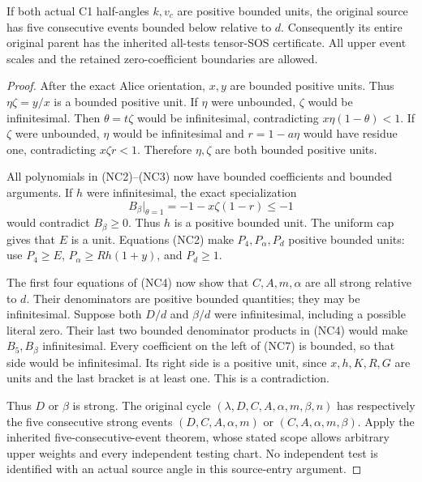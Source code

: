 \begin{theorem}
If both actual C1 half-angles $k,v_c$ are positive bounded units,
the original source has five consecutive events bounded below relative
to $d$. Consequently its entire original parent has the inherited
all-tests tensor-SOS certificate. All upper event scales and the
retained zero-coefficient boundaries are allowed.
\end{theorem}
\begin{proof}
After the exact Alice orientation, $x,y$ are bounded positive units.
Thus $\eta\zeta=y/x$ is a bounded positive unit. If $\eta$ were
unbounded, $\zeta$ would be infinitesimal. Then $\theta=t\zeta$
would be infinitesimal, contradicting $x\eta(1-\theta)<1$.
If $\zeta$ were unbounded, $\eta$ would be infinitesimal and
$r=1-a\eta$ would have residue one, contradicting $x\zeta r<1$.
Therefore $\eta,\zeta$ are both bounded positive units.

All polynomials in (NC2)--(NC3) now have bounded coefficients and
bounded arguments. If $h$ were infinitesimal, the exact specialization
\[
             B_\beta\big|_{\theta=1}
                    =-1-x\zeta(1-r)\le-1
\]
would contradict $B_\beta\ge0$. Thus $h$ is a positive bounded
unit. The uniform cap gives that $E$ is a unit. Equations (NC2) make
$P_4,P_\alpha,P_d$ positive bounded units: use $P_4\ge E$,
$P_\alpha\ge Rh(1+y)$, and $P_d\ge1$.

The first four equations of (NC4) now show that
$C,A,m,\alpha$ are all strong relative to $d$. Their denominators
are positive bounded quantities; they may be infinitesimal. Suppose
both $D/d$ and $\beta/d$ were infinitesimal, including a possible
literal zero. Their last two bounded denominator products in (NC4)
would make $B_5,B_\beta$ infinitesimal. Every coefficient on the
left of (NC7) is bounded, so that side would be infinitesimal. Its
right side is a positive unit, since $x,h,K,R,G$ are units and the
last bracket is at least one. This is a contradiction.

Thus $D$ or $\beta$ is strong. The original cycle
$(\lambda,D,C,A,\alpha,m,\beta,n)$ has respectively the five
consecutive strong events $(D,C,A,\alpha,m)$ or
$(C,A,\alpha,m,\beta)$. Apply the inherited five-consecutive-event
theorem, whose stated scope allows arbitrary upper weights and every
independent testing chart. No independent test is identified with
an actual source angle in this source-entry argument.
\end{proof}

